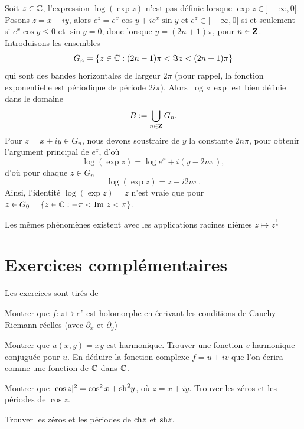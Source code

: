 Soit $z \in \mathbb{C}$, l'expression $\log(\exp z)$ n'est pas définie lorsque $\exp z \in ]-\infty, 0]$. Posons $z=x + iy$, alors $e^z=e^x \cos y + i e^x \sin y$ et $e^z \in ]-\infty, 0]$ si et seulement si $e^x \cos y \leq  0$ et $\sin y=0$, donc lorsque $y=(2n+1)\pi$, pour $n \in {\mathbf Z}$. Introduisons les ensembles
\[G_n = \{z \in \mathbb{C} : (2n-1) \pi < \Im z < (2n +1) \pi \}\]
qui sont des bandes horizontales de largeur $2 \pi$ (pour rappel, la fonction exponentielle est périodique de période $2 i \pi$). Alors $\log \circ \exp$ est bien définie dans le domaine
\[B : = \bigcup_{n \in {\mathbf Z}} G_n.\]
Pour $z =x + iy \in G_n$, nous devons soustraire de $y$ la constante $2 n \pi$, pour obtenir l'argument principal de $e^z$, d'où
\[\log (\exp z)= \log e^x + i(y-2 n \pi),\]
d'où pour chaque $z \in G_n$
\[\log(\exp z) = z - i 2 n \pi.\]
Ainsi, l'identité $\log (\exp z)= z$ n'est vraie que pour $z \in G_0 = \{z \in \mathbb{C} : - \pi < \text{Im } z < \pi \}$.

\begin{rem}
Les mêmes phénomènes existent avec les applications racines nièmes $z \mapsto z^{\frac{1}{n}}$
\end{rem}



\section{Exercices complémentaires}
Les exercices sont tirés de \cite{gamelin2001complex,remmert1991theory}

\begin{exer}
Montrer que $f \colon z \mapsto e^z$ est holomorphe en écrivant les conditions de Cauchy-Riemann réelles (avec $\partial_x$ et $\partial_y$)
\end{exer}

\begin{exer}
Montrer que $u(x,y) = xy$ est harmonique. Trouver une fonction $v$ harmonique conjuguée pour $u$. En déduire la fonction complexe $f = u+iv$ que l'on écrira comme une fonction de $\mathbb{C}$ dans $\mathbb{C}$. 
\end{exer}

\begin{exer}
Montrer que $\lvert \cos z\rvert^2=\cos^2 x + \mathrm{sh}^2 y$, où $z=x+i y$. Trouver les zéros et les périodes de $\cos z$. 
\end{exer}

\begin{exer}
Trouver les zéros et les périodes de $\mathrm{ch} z$ et $\mathrm{sh} z$. 
\end{exer}


